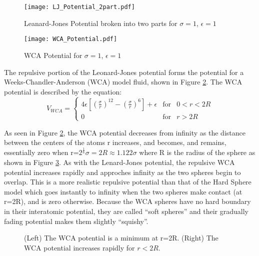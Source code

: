 \documentclass[12pt]{article}
\begin{document}
\begin{figure}[h!]
    \centering
    \texttt{[image: LJ\_Potential\_2part.pdf]}
    \caption{Leanard-Jones Potential broken into two parts for $\sigma=1$, $\epsilon=1$}
    \label{fig:LJ_potential_2parts}
  \end{figure}
 

\begin{figure}[h!]
    \centering
    \texttt{[image: WCA\_Potential.pdf]}
    \caption{WCA Potential for $\sigma=1$, $\epsilon=1$}
    \label{fig:WCA_potential}
  \end{figure}


The repulsive portion of the Leonard-Jones potential forms the potential for a Weeks-Chandler-Anderson (WCA) model fluid, shown in Figure \ref{fig:WCA_potential}. The WCA potential is described by the equation: \begin{equation}{V_{WCA}=\left\{\begin{array}{rcl} {4\epsilon{\left[\left(\frac{\sigma}{r}\right)^{12} - \left(\frac{\sigma}{r}\right)^6 \right]}+\epsilon} & \mbox{for} & 0<r<{2R} \\ 0 & \mbox{for} & r>2R \end{array}\right.}\end{equation} 

\noindent As seen in Figure \ref{fig:WCA_potential}, the WCA potential decreases from infinity as the distance between the centers of the atoms r increases, and becomes, and remains, essentially zero when r=$2^\frac{1}{6}\sigma=2R\approx{1.122}\sigma$ where R is the radius of the sphere as shown in Figure \ref{fig:TwoSpheres}. As with the Lenard-Jones potential, the repulsive WCA potential increases rapidly and approches infinity as the two spheres begin to overlap. This is a more realistic repulsive potential than that of the Hard Sphere model which goes instantly to infinity when the two spheres make contact (at r=2R), and is zero otherwise. Because the WCA spheres have no hard boundary in their interatomic potential, they are called ``soft spheres'' and their gradually fading potential makes them slightly ``squishy''.

\begin{figure}[h!]
    \centering
    \caption{(Left) The WCA potential is a minimum at r=2R. 
             (Right) The WCA potential increases rapidly for $r<2R$.}
    \label{fig:TwoSpheres}
    \end{figure} 
\end{document}
